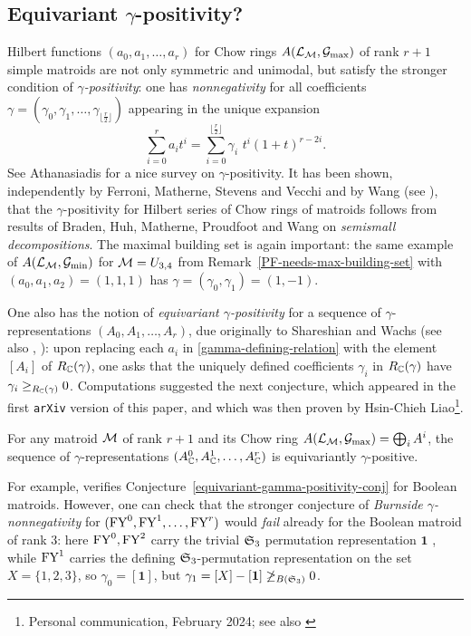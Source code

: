\subsection{Equivariant $\gamma$-positivity?}
Hilbert functions $(a_0,a_1,\ldots,a_r)$ for
Chow rings $A(\mathcal{L}_{\mathcal{M}},\mathcal{G}_{\max})$ of rank $r+1$ simple matroids are
not only symmetric and unimodal, but satisfy the stronger condition of
{\it $\gamma$-positivity}:  one has {\it nonnegativity} for all coefficients 
$\gamma=(\gamma_0,\gamma_1,\ldots,\gamma_{\lfloor \frac{r}{2} \rfloor})$ appearing in the unique expansion
\begin{equation}
\label{gamma-defining-relation}
\sum_{i=0}^r a_i t^i = \sum_{i=0}^{\lfloor\frac{r}{2}\rfloor} \gamma_i \,\, t^i(1+t)^{r-2i}.
\end{equation}
See Athanasiadis \cite{Athanasiadis} for a nice survey on $\gamma$-positivity.
It has been shown, independently 
by Ferroni, Matherne, Stevens and Vecchi \cite[Thm. 3.25]{FMSV}
and by Wang (see \cite[p.~29]{FMSV}), that the $\gamma$-positivity for Hilbert series of Chow rings of matroids
follows from results of Braden, Huh, Matherne, Proudfoot and Wang \cite{BHMPW} on {\it semismall decompositions}.
The maximal building set is again important: the
same example of $A(\mathcal{L}_{\mathcal{M}},\mathcal{G}_{\min})$ for $\mathcal{M}=U_{3,4}$ from Remark~\ref{PF-needs-max-building-set} with $(a_0,a_1,a_2)=(1,1,1)$ has $\gamma=(\gamma_0,\gamma_1)=(1,-1)$.

One also has the notion of {\it equivariant $\gamma$-positivity} for a sequence
of $\gamma$-representations $(A_0,A_1,\ldots,A_r)$, 
due originally to Shareshian and Wachs
\cite[\S 5]{ShareshianWachs} (see also \cite[\S5.2]{Athanasiadis}, \cite[Def. 4.13]{FMSV}): upon replacing each
$a_i$ in \eqref{gamma-defining-relation} with the element $[A_i]$ of $R_{\mathbb{C}}(\gamma)$, one
asks that the uniquely defined coefficients $\gamma_i$ in $R_{\mathbb{C}}(\gamma)$ have $\gamma_i \geq_{R_{\mathbb{C}}(\gamma)} 0$.
Computations suggested the next conjecture, which appeared in the first {\tt arXiv} version of this paper, and which was then proven by Hsin-Chieh Liao\footnote{Personal communication, February 2024; see also \cite[\S8]{liao-q-uniform}}.

\begin{conj}
\label{equivariant-gamma-positivity-conj}
For any matroid $\mathcal{M}$ of rank $r+1$ and its Chow ring
$A(\mathcal{L}_{\mathcal{M}},\mathcal{G}_{\max})=\bigoplus_i A^i$,
the sequence of $\gamma$-representations
$(A^0_{\mathbb{C}},A^1_{\mathbb{C}},\ldots,A^r_{\mathbb{C}})$ is equivariantly $\gamma$-positive.
\end{conj}
\noindent
For example, \cite[Cor. 5.4]{ShareshianWachs} verifies Conjecture~\ref{equivariant-gamma-positivity-conj} for Boolean matroids.
However, one can check that the stronger conjecture of {\it Burnside $\gamma$-nonnegativity} for $(\mathrm{FY}^0,\mathrm{FY}^1,\ldots,\mathrm{FY}^r)$
would  {\it fail} already for the Boolean 
matroid of rank $3$:  here
$\mathrm{FY}^0, \mathrm{FY}^2$ carry the trivial $\mathfrak{S}_3$ permutation representation $\mathbf{1}$ , while $\mathrm{FY}^1$ carries the defining $\mathfrak{S}_3$-permutation representation on the set $X=\{1,2,3\}$, so
$\gamma_0=[\mathbf{1}]$, but $\gamma_1=[X]-[\mathbf{1}] \not\geq_{B(\mathfrak{S}_3)} 0$.